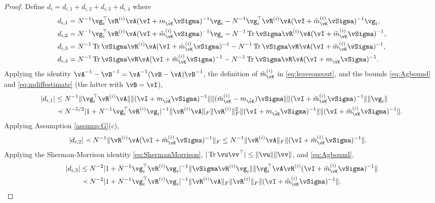 \begin{proof}
Define
$d_i=d_{i,1}+d_{i,2}+d_{i,3}+d_{i,4}$ where
\begin{equation}\label{eq:di14}
\begin{aligned}
d_{i,1}&=N^{-1}\vg_i^\top \vR^{(i)}\vA(\vI+m_{\tilde \vK}\vSigma)^{-1}
\vg_i-N^{-1}\vg_i^\top \vR^{(i)}\vA(\vI+\tilde m_{\vK}^{(i)}\vSigma)^{-1}\vg_i,\\
d_{i,2}&=N^{-1}\vg_i^\top \vR^{(i)}\vA(\vI+\tilde m_{\vK}^{(i)}\vSigma)^{-1}
\vg_i-N^{-1}\Tr \vSigma \vR^{(i)}\vA(\vI+\tilde m_{\vK}^{(i)}\vSigma)^{-1},\\
d_{i,3}&=N^{-1}\Tr \vSigma \vR^{(i)}\vA(\vI+\tilde m_{\vK}^{(i)}\vSigma)^{-1}
-N^{-1}\Tr \vSigma \vR\vA(\vI+\tilde m_{\vK}^{(i)}\vSigma)^{-1},\\
d_{i,4}&=N^{-1}\Tr \vSigma \vR\vA(\vI+\tilde m_{\vK}^{(i)}\vSigma)^{-1}
-N^{-1}\Tr \vSigma \vR\vA(\vI+m_{\tilde \vK}\vSigma)^{-1}.
\end{aligned}
\end{equation}
Applying the identity $\vA^{-1}-\vB^{-1}=\vA^{-1}(\vB-\vA)\vB^{-1}$,
the definition of $\tilde m_{\vK}^{(i)}$ in \eqref{eq:leaveoneout},
and the bounds \eqref{eq:Agbound} and \eqref{eq:mdiffestimate} (the latter with
$\vB=\vI$),
\begin{align}
|d_{i,1}| &\leq N^{-1} \|\vg_i^\top \vR^{(i)}\vA\|
\|(\vI+m_{\tilde \vK}\vSigma)^{-1}\| \|(\tilde m_{\vK}^{(i)}-m_{\tilde
\vK})\vSigma\| \|(\vI+\tilde m_{\vK}^{(i)}\vSigma)^{-1}\| \|\vg_i\|\nonumber\\
&\prec N^{-5/2} |1+N^{-1}\vg_i^\top \vR^{(i)}\vg_i|^{-1} 
\|\vR^{(i)}\vA\|_F \|\vR^{(i)}\|_F^2 \|(\vI+m_{\tilde \vK}\vSigma)^{-1}\|
\|(\vI+\tilde m_{\vK}^{(i)}\vSigma)^{-1}\|.\label{eq:di1}
\end{align}
Applying Assumption \ref{assump:G}(c),
\begin{align}
|d_{i,2}| &\prec N^{-1} \|\vR^{(i)}\vA(\vI+\tilde m_{\vK}^{(i)}\vSigma)^{-1}\|_F
\leq N^{-1} \|\vR^{(i)}\vA\|_F \|(\vI+\tilde m_{\vK}^{(i)}\vSigma)^{-1}\|.\label{eq:di2}
\end{align}
Applying the Sherman-Morrison identity \eqref{eq:ShermanMorrison},
$|\Tr \vu\vv^\top| \leq \|\vu\| \|\vv\|$, and \eqref{eq:Agbound},
\begin{align}
|d_{i,3}| & \leq N^{-2} |1+N^{-1}\vg_i^\top \vR^{(i)}\vg_i|^{-1}
\|\vSigma \vR^{(i)}\vg_i\| \|\vg_i^\top \vA
\vR^{(i)}(\vI+\tilde m_{\vK}^{(i)}\vSigma)^{-1}\|\nonumber\\
&\prec N^{-2} |1+N^{-1}\vg_i^\top \vR^{(i)} \vg_i|^{-1}
\|\vR^{(i)}\vA\|_F \|\vR^{(i)}\|_F \|(\vI+\tilde m_{\vK}^{(i)}\vSigma)^{-1}\|.\label{eq:di3}

\end{align}
\end{proof}
